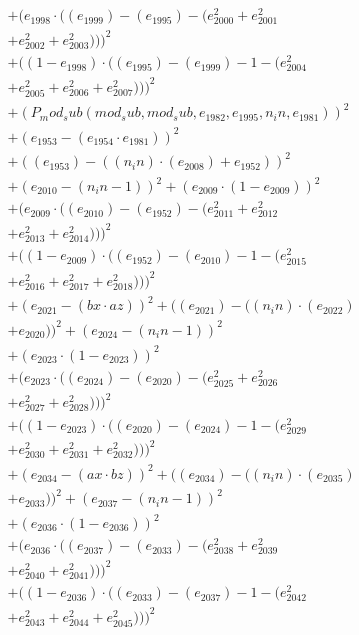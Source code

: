 \documentclass[10pt, a4paper]{article}
\begin{document}
\begin{small}
\begin{align*}
& + (e_{1998}  \cdot  ((e_{1999}) - (e_{1995}) - (e_{2000}^{2} + e_{2001}^{2} \\
& + e_{2002}^{2} + e_{2003}^{2})))^{2} \\
& + ((1 - e_{1998})  \cdot  ((e_{1995}) - (e_{1999}) - 1 - (e_{2004}^{2} \\
& + e_{2005}^{2} + e_{2006}^{2} + e_{2007}^{2})))^{2} \\
& + (P_mod_sub(mod_sub, mod_sub, e_{1982}, e_{1995}, n_in, e_{1981}))^{2} \\
& + (e_{1953} - (e_{1954}  \cdot  e_{1981}))^{2} \\
& + ((e_{1953}) - ((n_in)  \cdot  (e_{2008}) + e_{1952}))^{2} \\
& + (e_{2010} - (n_in - 1))^{2} + (e_{2009}  \cdot  (1 - e_{2009}))^{2} \\
& + (e_{2009}  \cdot  ((e_{2010}) - (e_{1952}) - (e_{2011}^{2} + e_{2012}^{2} \\
& + e_{2013}^{2} + e_{2014}^{2})))^{2} \\
& + ((1 - e_{2009})  \cdot  ((e_{1952}) - (e_{2010}) - 1 - (e_{2015}^{2} \\
& + e_{2016}^{2} + e_{2017}^{2} + e_{2018}^{2})))^{2} \\
& + (e_{2021} - (bx  \cdot  az))^{2} + ((e_{2021}) - ((n_in)  \cdot  (e_{2022}) \\
& + e_{2020}))^{2} + (e_{2024} - (n_in - 1))^{2} \\
& + (e_{2023}  \cdot  (1 - e_{2023}))^{2} \\
& + (e_{2023}  \cdot  ((e_{2024}) - (e_{2020}) - (e_{2025}^{2} + e_{2026}^{2} \\
& + e_{2027}^{2} + e_{2028}^{2})))^{2} \\
& + ((1 - e_{2023})  \cdot  ((e_{2020}) - (e_{2024}) - 1 - (e_{2029}^{2} \\
& + e_{2030}^{2} + e_{2031}^{2} + e_{2032}^{2})))^{2} \\
& + (e_{2034} - (ax  \cdot  bz))^{2} + ((e_{2034}) - ((n_in)  \cdot  (e_{2035}) \\
& + e_{2033}))^{2} + (e_{2037} - (n_in - 1))^{2} \\
& + (e_{2036}  \cdot  (1 - e_{2036}))^{2} \\
& + (e_{2036}  \cdot  ((e_{2037}) - (e_{2033}) - (e_{2038}^{2} + e_{2039}^{2} \\
& + e_{2040}^{2} + e_{2041}^{2})))^{2} \\
& + ((1 - e_{2036})  \cdot  ((e_{2033}) - (e_{2037}) - 1 - (e_{2042}^{2} \\
& + e_{2043}^{2} + e_{2044}^{2} + e_{2045}^{2})))^{2} \\

\end{align*}
\end{small}
\end{document}
